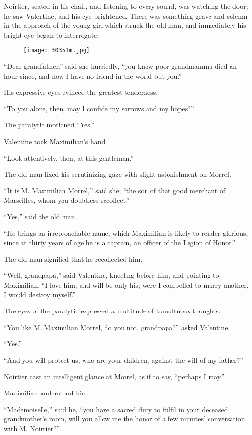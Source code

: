 Noirtier, seated in his chair, and listening to every sound, was
watching the door; he saw Valentine, and his eye brightened. There was
something grave and solemn in the approach of the young girl which
struck the old man, and immediately his bright eye began to
interrogate.

\begin{figure}[ht]
\texttt{[image: 30351m.jpg]}
\end{figure}

“Dear grandfather.” said she hurriedly, “you know poor grandmamma died
an hour since, and now I have no friend in the world but you.”

His expressive eyes evinced the greatest tenderness.

“To you alone, then, may I confide my sorrows and my hopes?”

The paralytic motioned “Yes.”

Valentine took Maximilian’s hand.

“Look attentively, then, at this gentleman.”

The old man fixed his scrutinizing gaze with slight astonishment on
Morrel.

“It is M. Maximilian Morrel,” said she; “the son of that good merchant
of Marseilles, whom you doubtless recollect.”

“Yes,” said the old man.

“He brings an irreproachable name, which Maximilian is likely to render
glorious, since at thirty years of age he is a captain, an officer of
the Legion of Honor.”

The old man signified that he recollected him.

“Well, grandpapa,” said Valentine, kneeling before him, and pointing to
Maximilian, “I love him, and will be only his; were I compelled to
marry another, I would destroy myself.”

The eyes of the paralytic expressed a multitude of tumultuous thoughts.

“You like M. Maximilian Morrel, do you not, grandpapa?” asked
Valentine.

“Yes.”

“And you will protect us, who are your children, against the will of my
father?”

Noirtier cast an intelligent glance at Morrel, as if to say, “perhaps I
may.”

Maximilian understood him.

“Mademoiselle,” said he, “you have a sacred duty to fulfil in your
deceased grandmother’s room, will you allow me the honor of a few
minutes’ conversation with M. Noirtier?”

